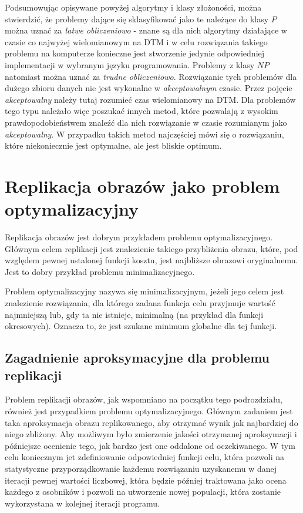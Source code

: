 Podsumowując opisywane powyżej algorytmy i klasy złożoności, można stwierdzić, że problemy dające się sklasyfikować jako te należące do klasy $P$ można uznać za \textit{łatwe obliczeniowo} - znane są dla nich algorytmy działające w czasie co najwyżej wielomianowym na DTM i w celu rozwiązania takiego problemu na komputerze konieczne jest stworzenie jedynie odpowiedniej implementacji w wybranym języku programowania. Problemy z klasy $NP$ natomiast można uznać za \textit{trudne obliczeniowo}. Rozwiązanie tych problemów dla dużego zbioru danych nie jest wykonalne w \textit{akceptowalnym} czasie. Przez pojęcie \textit{akceptowalny} należy tutaj rozumieć czas wielomianowy na DTM. Dla problemów tego typu należało więc poszukać innych metod, które pozwalają z wysokim prawdopodobieństwem znaleźć dla nich rozwiązanie w czasie rozumianym jako \textit{akceptowalny}. W przypadku takich metod najczęściej mówi się o rozwiązaniu, które niekoniecznie jest optymalne, ale jest bliskie optimum.

\section{Replikacja obrazów jako problem optymalizacyjny}

Replikacja obrazów jest dobrym przykładem problemu optymalizacyjnego. Głównym celem replikacji jest znalezienie takiego przybliżenia obrazu, które, pod względem pewnej ustalonej funkcji kosztu, jest najbliższe obrazowi oryginalnemu. Jest to dobry przykład problemu minimalizacyjnego.

\begin{definition}
Problem optymalizacyjny nazywa się minimalizacyjnym, jeżeli jego celem jest znalezienie rozwiązania, dla którego zadana funkcja celu przyjmuje wartość najmniejszą lub, gdy ta nie istnieje, minimalną (na przykład dla funkcji okresowych). Oznacza to, że jest szukane minimum globalne dla tej funkcji.
\end{definition}

\subsection{Zagadnienie aproksymacyjne dla problemu replikacji}

Problem replikacji obrazów, jak wspomniano na początku tego podrozdziału, również jest przypadkiem problemu optymalizacyjnego. Głównym zadaniem jest taka aproksymacja obrazu replikowanego, aby otrzymać wynik jak najbardziej do niego zbliżony. Aby możliwym było zmierzenie jakości otrzymanej aproksymacji i późniejsze ocenienie tego, jak bardzo jest one oddalone od oczekiwanego. W tym celu koniecznym jet zdefiniowanie odpowiedniej funkcji celu, która pozwoli na statystyczne przyporządkowanie każdemu rozwiązaniu uzyskanemu w danej iteracji pewnej wartości liczbowej, która będzie później traktowana jako ocena każdego z osobników i pozwoli na utworzenie nowej populacji, która zostanie wykorzystana w kolejnej iteracji programu.


